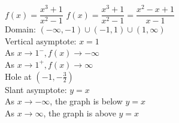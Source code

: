 {$f(x) = \dfrac{x^{3} + 1}{x^{2} - 1}$}
{$f(x) = \dfrac{x^{3} + 1}{x^{2} - 1} = \dfrac{x^{2} - x+ 1}{x-1}$\\
Domain: $(-\infty, -1) \cup (-1, 1) \cup (1, \infty)$\\
Vertical asymptote: $x = 1$\\
As $x \rightarrow 1^{-}, f(x) \rightarrow -\infty$\\
As $x \rightarrow 1^{+}, f(x) \rightarrow \infty$\\
Hole at $(-1, -\frac{3}{2})$\\
Slant asymptote: $y=x$  \\
As $x \rightarrow -\infty$, the graph is below $y=x$\\
As $x \rightarrow \infty$, the graph is above $y=x$}
